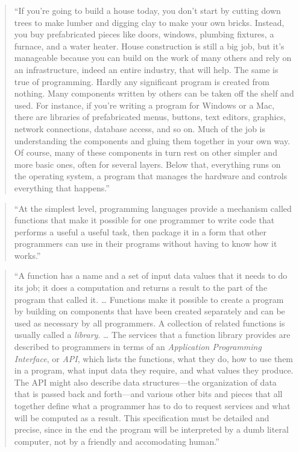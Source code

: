 \documentclass[]{tufte-book}
\begin{document}
\begin{quote}
``If you're going to build a house today, you don't start by cutting down trees to make
lumber and digging clay to make your own bricks. Instead, you buy prefabricated pieces like
doors, windows, plumbing fixtures, a furnace, and a water heater. House construction is still
a big job, but it's manageable because you can build on the work of many others and rely
on an infrastructure, indeed an entire industry, that will help. The same is true of
programming. Hardly any significant program is created from nothing. Many components written
by others can be taken off the shelf and used. For instance, if you're writing a program for
Windows or a Mac, there are libraries of prefabricated menus, buttons, text editors, graphics,
network connections, database access, and so on. Much of the job is understanding the components
and gluing them together in your own way. Of course, many of these components in turn rest on
other simpler and more basic ones, often for several layers. Below that, everything runs on
the operating system, a program that manages the hardware and controls everything that happens.''
\citep{kernighan2011d}
\end{quote}

\begin{quote}
``At the simplest level, programming languages provide a mechanism called functions that make
it possible for one programmer to write code that performs a useful a useful task, then package
it in a form that other programmers can use in their programs without having to know how it
works.'' \citep{kernighan2011d}
\end{quote}

\begin{quote}
``A function has a name and a set of input data values that it needs to do its job; it does
a computation and returns a result to the part of the program that called it. \ldots{} Functions
make it possible to create a program by building on components that have been created separately
and can be used as necessary by all programmers. A collection of related functions is usually
called a \emph{library}. \ldots{} The services that a function library provides are described to programmers
in terms of an \emph{Application Programming Interface}, or \emph{API}, which lists the functions, what
they do, how to use them in a program, what input data they require, and what values they
produce. The API might also describe data structures---the organization of data that is passed
back and forth---and various other bits and pieces that all together define what a programmer
has to do to request services and what will be computed as a result. This specification must
be detailed and precise, since in the end the program will be interpreted by a dumb literal
computer, not by a friendly and accomodating human.'' \citep{kernighan2011d}
\end{quote}
\end{document}
